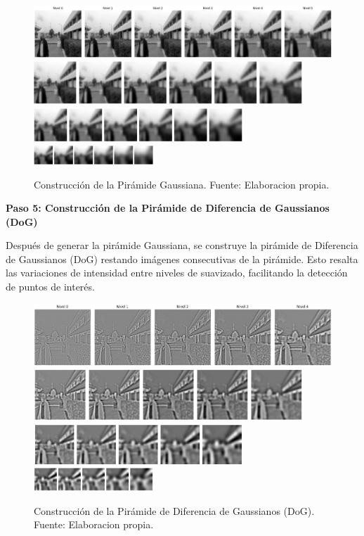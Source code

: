 \documentclass[a4paper]{article}
\begin{document}
\begin{figure}[H]
    \centering
    \includegraphics[width=1.1\textwidth]{images/sift_paso_3.1.png}
    \includegraphics[width=0.9\textwidth]{images/sift_paso_3.2.png}
    \includegraphics[width=0.7\textwidth]{images/sift_paso_3.3.png}
    \includegraphics[width=0.4\textwidth]{images/sift_paso_3.4.png}
    \caption{Construcción de la Pirámide Gaussiana. Fuente: Elaboracion propia.}
\end{figure}

\textbf{Paso 5: Construcción de la Pirámide de Diferencia de Gaussianos (DoG)}

Después de generar la pirámide Gaussiana, se construye la pirámide de Diferencia de Gaussianos (DoG) restando imágenes consecutivas de la pirámide. Esto resalta las variaciones de intensidad entre niveles de suavizado, facilitando la detección de puntos de interés.

\begin{figure}[H]
    \centering
    \includegraphics[width=1.1\textwidth]{images/sift_paso_4.1.png}
    \includegraphics[width=0.9\textwidth]{images/sift_paso_4.2.png}
    \includegraphics[width=0.7\textwidth]{images/sift_paso_4.3.png}
    \includegraphics[width=0.4\textwidth]{images/sift_paso_4.4.png}
    \caption{Construcción de la Pirámide de Diferencia de Gaussianos (DoG). Fuente: Elaboracion propia.}
\end{figure}
\end{document}
